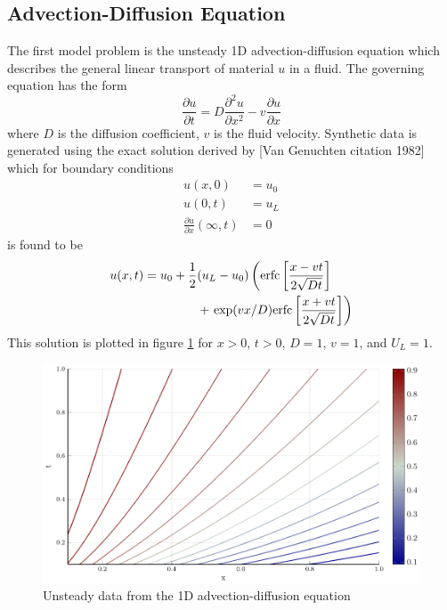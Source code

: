 \documentclass{article}
\begin{document}
\subsection{Advection-Diffusion Equation}

The first model problem is the unsteady 1D advection-diffusion equation which describes the general linear transport of material $u$ in a fluid. The governing equation has the form 
\begin{equation} 
\frac{\partial u}{\partial t} = D\frac{\partial^2 u}{\partial x^2} - v \frac{\partial u}{\partial x}
\end{equation}
where $D$ is the diffusion coefficient, $v$ is the fluid velocity. Synthetic data is generated using the exact solution derived by [Van Genuchten citation 1982] which for boundary conditions 
\begin{align}
  u(x,0) &= u_0 \\
  u(0,t) &= u_L \\
  \frac{\partial u}{\partial x}(\infty, t) &= 0
\end{align}
is found to be 
\begin{equation}
  \begin{split}
  u(x,t) = u_0 + \frac{1}{2}&(u_L - u_0) \left({\rm erfc}\left[ \frac{x - vt}{2\sqrt{Dt}}\right]\right. \\
  &+ \left.{\rm exp}(vx/D) {\rm erfc}\left[ \frac{x + vt}{2\sqrt{Dt}}\right] \right)
  \end{split}
\end{equation}
This solution is plotted in figure \ref{fig:advdif} for $x>0$, $t>0$, $D=1$, $v=1$, and $U_L = 1$.

\begin{figure}
\vskip 0.2in
\begin{center}
\centerline{\includegraphics[width=\columnwidth]{./figures/advdif}}
\caption{Unsteady data from the 1D advection-diffusion equation}
\label{fig:advdif}
\end{center}
\vskip -0.2in
\end{figure}
\end{document}
